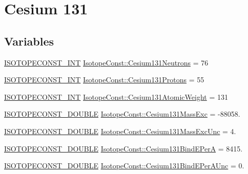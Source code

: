 \hypertarget{group___isotope_const-_cesium-_cs131}{}\section{Cesium 131}
\label{group___isotope_const-_cesium-_cs131}
\subsection*{Variables}
\begin{DoxyCompactItemize}
\item 
\mbox{\hyperlink{group___isotope_const-_macros_ga5f18360b3e99483a35c32d789e62621c}{I\+S\+O\+T\+O\+P\+E\+C\+O\+N\+S\+T\+\_\+\+I\+NT}} \mbox{\hyperlink{group___isotope_const-_cesium-_cs131_ga6cca3a47bf2570813c1dfd5fdf6976a1}{Isotope\+Const\+::\+Cesium131\+Neutrons}} = 76
\item 
\mbox{\hyperlink{group___isotope_const-_macros_ga5f18360b3e99483a35c32d789e62621c}{I\+S\+O\+T\+O\+P\+E\+C\+O\+N\+S\+T\+\_\+\+I\+NT}} \mbox{\hyperlink{group___isotope_const-_cesium-_cs131_ga061eaac919c97f497f26388829d1c9dc}{Isotope\+Const\+::\+Cesium131\+Protons}} = 55
\item 
\mbox{\hyperlink{group___isotope_const-_macros_ga5f18360b3e99483a35c32d789e62621c}{I\+S\+O\+T\+O\+P\+E\+C\+O\+N\+S\+T\+\_\+\+I\+NT}} \mbox{\hyperlink{group___isotope_const-_cesium-_cs131_ga6b9e1fddb824e3583564b541900ccddc}{Isotope\+Const\+::\+Cesium131\+Atomic\+Weight}} = 131
\item 
\mbox{\hyperlink{group___isotope_const-_macros_ga8f45a7272ce02c0b4c65c44636ed719a}{I\+S\+O\+T\+O\+P\+E\+C\+O\+N\+S\+T\+\_\+\+D\+O\+U\+B\+LE}} \mbox{\hyperlink{group___isotope_const-_cesium-_cs131_ga1746d23d6d5f3cfed682883fd28ddfd0}{Isotope\+Const\+::\+Cesium131\+Mass\+Exc}} = -\/88058.
\item 
\mbox{\hyperlink{group___isotope_const-_macros_ga8f45a7272ce02c0b4c65c44636ed719a}{I\+S\+O\+T\+O\+P\+E\+C\+O\+N\+S\+T\+\_\+\+D\+O\+U\+B\+LE}} \mbox{\hyperlink{group___isotope_const-_cesium-_cs131_gad4a09eff8972bde6a41bf58b260e1c76}{Isotope\+Const\+::\+Cesium131\+Mass\+Exc\+Unc}} = 4.
\item 
\mbox{\hyperlink{group___isotope_const-_macros_ga8f45a7272ce02c0b4c65c44636ed719a}{I\+S\+O\+T\+O\+P\+E\+C\+O\+N\+S\+T\+\_\+\+D\+O\+U\+B\+LE}} \mbox{\hyperlink{group___isotope_const-_cesium-_cs131_ga40eb55baa35229de160b789538846938}{Isotope\+Const\+::\+Cesium131\+Bind\+E\+PerA}} = 8415.
\item 
\mbox{\hyperlink{group___isotope_const-_macros_ga8f45a7272ce02c0b4c65c44636ed719a}{I\+S\+O\+T\+O\+P\+E\+C\+O\+N\+S\+T\+\_\+\+D\+O\+U\+B\+LE}} \mbox{\hyperlink{group___isotope_const-_cesium-_cs131_ga6d1cb31977a0ee7ded9425479a03f75b}{Isotope\+Const\+::\+Cesium131\+Bind\+E\+Per\+A\+Unc}} = 0.

\end{DoxyCompactItemize}
